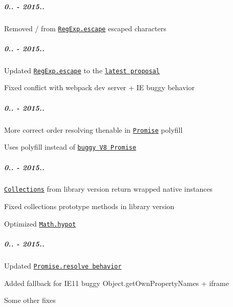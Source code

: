 \subparagraph*{0.. -\/ 2015..}


\begin{DoxyItemize}
\item Removed {\ttfamily /} from \href{https://github.com/zloirock/core-js/#ecmascript-7-proposals}{\tt {\ttfamily Reg\+Exp.\+escape}} escaped characters
\end{DoxyItemize}

\subparagraph*{0.. -\/ 2015..}


\begin{DoxyItemize}
\item Updated \href{https://github.com/zloirock/core-js/#ecmascript-7-proposals}{\tt {\ttfamily Reg\+Exp.\+escape}} to the \href{https://github.com/benjamingr/RexExp.escape}{\tt latest proposal}
\item Fixed conflict with webpack dev server + IE buggy behavior
\end{DoxyItemize}

\subparagraph*{0.. -\/ 2015..}


\begin{DoxyItemize}
\item More correct order resolving thenable in \href{https://github.com/zloirock/core-js/#ecmascript-6-promise}{\tt {\ttfamily Promise}} polyfill
\item Uses polyfill instead of \href{https://github.com/zloirock/core-js/issues/78}{\tt buggy V8 {\ttfamily Promise}}
\end{DoxyItemize}

\subparagraph*{0.. -\/ 2015..}


\begin{DoxyItemize}
\item \href{https://github.com/zloirock/core-js/#ecmascript-6-collections}{\tt Collections} from {\ttfamily library} version return wrapped native instances
\item Fixed collections prototype methods in {\ttfamily library} version
\item Optimized \href{https://github.com/zloirock/core-js/#ecmascript-6-math}{\tt {\ttfamily Math.\+hypot}}
\end{DoxyItemize}

\subparagraph*{0.. -\/ 2015..}


\begin{DoxyItemize}
\item Updated \href{https://esdiscuss.org/topic/fixing-promise-resolve}{\tt {\ttfamily Promise.\+resolve} behavior}
\item Added fallback for I\+E11 buggy {\ttfamily Object.\+get\+Own\+Property\+Names} + iframe
\item Some other fixes
\end{DoxyItemize}

